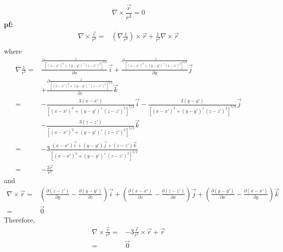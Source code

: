 \documentclass[10pt,a4paper]{article}
\begin{document}
\subsection{}
\[
\nabla\times\frac{\vec{r}}{r^3}=0
\]
\textbf{pf:}
\begin{align*}
\nabla\times\frac{\vec{r}}{r^3}=&(\nabla\frac{1}{r^3})\times\vec{r}+\frac{1}{r^3}\nabla\times\vec{r}\\
\end{align*}
where
\begin{align*}
\nabla\frac{1}{r^3}=&\frac{\partial\frac{1}{[(x-x')^2+(y-y')^+(z-z')^2]^{3/2}}}{\partial x}\vec{i}+\frac{\partial\frac{1}{[(x-x')^2+(y-y')^+(z-z')^2]^{3/2}}}{\partial y}\vec{j}\\
&+\frac{\partial\frac{1}{[(x-x')^2+(y-y')^+(z-z')^2]^{3/2}}}{\partial z}\vec{k}\\
=&-\frac{3(x-x')}{[(x-x')^2+(y-y')^+(z-z')^2]^{5/2}}\vec{i}-\frac{3(y-y')}{[(x-x')^2+(y-y')^+(z-z')^2]^{5/2}}\vec{j}\\
&-\frac{3(z-z')}{[(x-x')^2+(y-y')^+(z-z')^2]^{5/2}}\vec{k}\\
=&-3\frac{(x-x')\vec{i}+(y-y')\vec{j}+(z-z')\vec{k}}{[(x-x')^2+(y-y')^+(z-z')^2]^{5/2}}\\
=&-\frac{3\vec{r}}{r^5}
\end{align*}
and
\begin{align*}
\nabla\times\vec{r}=&(\frac{\partial(z-z')}{\partial y}-\frac{\partial(y-y')}{\partial z})\vec{i}+(\frac{\partial(x-x')}{\partial z}-\frac{\partial(z-z')}{\partial x})\vec{j}+(\frac{\partial(y-y')}{\partial x}-\frac{\partial(x-x')}{\partial y})\vec{k}\\
=&\vec{0}
\end{align*}
Therefore,
\begin{align*}
\nabla\times\frac{\vec{r}}{r^3}=&-3\frac{\vec{r}}{r^5}\times\vec{r}+\vec{r}\\
=&\vec{0}
\end{align*}
\end{document}
